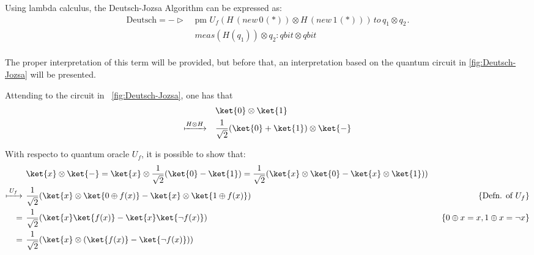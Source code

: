   Using lambda calculus, the Deutsch-Jozsa Algorithm can be expressed as:
  \begin{align*}
  \text{Deutsch} =  - \triangleright & \hspace{3pt} \text{pm} \hspace{4pt}  U_{f}(H  \hspace{2pt}   ( \textit{new}   \hspace{2pt}  0 \hspace{1pt}(*)) \otimes H  \hspace{2pt}   ( \textit{new}   \hspace{2pt}  1 \hspace{1pt}(*))) \hspace{2pt}  \textit{to} \hspace{2pt} q_{1} \otimes q_{2} \hspace{1pt}. \\
  &\hspace{3pt} \textit{meas} (H( q_{1})) \otimes q_{2} : \textit{qbit} \otimes \textit{qbit}  \\ 
   \end{align*}

The proper interpretation of this term will be provided, but before that, an interpretation based on the quantum circuit in \autoref{fig:Deutsch-Jozsa} will be presented. 

Attending to the circuit in  \autoref{fig:Deutsch-Jozsa}, one has that
  \begin{equation} \label{eq:Deutsch-1H}
  \begin{split}
   & \ket{0} \otimes \ket{1} \\
   \xmapsto{ H \otimes H} \quad & \frac{1}{\sqrt{2}}(\ket{0} + \ket{1}) \otimes \ket{-} \\
  \end{split}
  \end{equation}
  
  With respecto to  quantum oracle $U_f$, it is possible to show that:
  \begin{equation}
  \begin{split}
    &\ket{x} \otimes \ket{-} =   \ket{x} \otimes \frac{1}{\sqrt{2}}(\ket{0} - \ket{1}) = \frac{1}{\sqrt{2}}(\ket{x} \otimes \ket{0} - \ket{x} \otimes \ket{1})) \\
    \xmapsto{ \hspace{2pt} U_{f} \hspace{2pt}} \hspace{4pt} &  \frac{1}{\sqrt{2}}(\ket{x} \otimes \ket{0 \oplus f(x)} - \ket{x} \otimes \ket{1 \oplus f(x)}) &\hspace{50pt} \{\text{Defn. of } U_f\} \\
    = \hspace{4pt}  & \frac{1}{\sqrt{2}}(\ket{x} \ket{f(x)} - \ket{x} \ket{\neg f(x)}) & \{0\oplus x=x, 1\oplus x = \neg x\} \\
    = \hspace{4pt}  & \frac{1}{\sqrt{2}}(\ket{x} \otimes (\ket{f(x)}-\ket{\neg f(x)}))
   \end{split}
  \end{equation}
  
